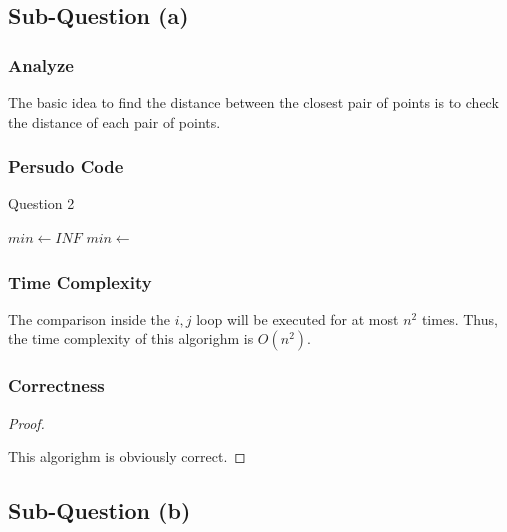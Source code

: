 \documentclass{article}
\newcommand{\bftit}[1]{\noindent\textbf{#1}}
\begin{document}
    \subsection{Sub-Question (a)}

    \subsubsection{\bftit{Analyze}}

    The basic idea to find the distance between the closest pair of points is to check the distance of each pair of points.

    \subsubsection{\bftit{Persudo Code}}

    \begin{algorithm}[h]
        \large
        \caption{Question 2}
        \begin{algorithmic}[1]
            \State $min \gets INF$
                    \State $min \gets$ 
                    \EndIf
                \EndFor
            \EndFor
            \State {}
            \EndFunction
        \end{algorithmic}
    \end{algorithm}

    \subsubsection{\bftit{Time Complexity}}

    The comparison inside the $i, j$ loop will be executed for at most $n^2$ times. Thus, the time complexity of this algorighm is $O(n^2)$.

    \subsubsection{\bftit{Correctness}}

    \begin{proof}
        \

        This algorighm is obviously correct.
    \end{proof}

    \subsection{\bftit{Sub-Question (b)}}
\end{document}
